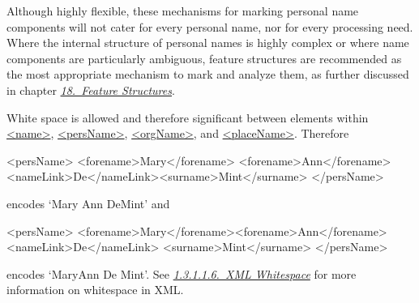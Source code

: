 Although highly flexible, these mechanisms for marking personal name components will not cater for every personal name, nor for every processing need. Where the internal structure of personal names is highly complex or where name components are particularly ambiguous, feature structures are recommended as the most appropriate mechanism to mark and analyze them, as further discussed in chapter \textit{\hyperref[FS]{18.\ Feature Structures}}.\par
White space is allowed and therefore significant between elements within \hyperref[TEI.name]{<name>}, \hyperref[TEI.persName]{<persName>}, \hyperref[TEI.orgName]{<orgName>}, and \hyperref[TEI.placeName]{<placeName>}. Therefore \par\hfill\bgroup\exampleFont\vskip 10pt\begin{shaded}
\obeyspaces <persName> <forename>Mary</forename> <forename>Ann</forename> <nameLink>De</nameLink><surname>Mint</surname> </persName>\end{shaded}
\par\egroup 
 encodes ‘Mary Ann DeMint’ and \par\hfill\bgroup\exampleFont\vskip 10pt\begin{shaded}
\obeyspaces <persName> <forename>Mary</forename><forename>Ann</forename> <nameLink>De</nameLink> <surname>Mint</surname> </persName>\end{shaded}
\par\egroup 
 encodes ‘MaryAnn De Mint’. See \textit{\hyperref[STGAxs]{1.3.1.1.6.\ XML Whitespace}} for more information on whitespace in XML.
